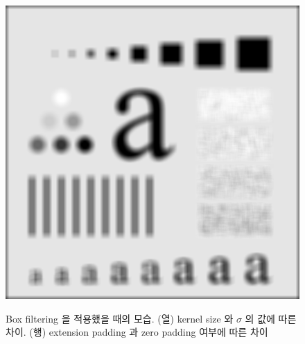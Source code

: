 \documentclass[a4paper, 12p]{paper}
\begin{document}
\begin{figure}[H]
{\includegraphics[scale=0.22]{../data/box2_zeropad.png}
}
\caption{Box filtering 을 적용했을 때의 모습. (열) kernel size 와 $\sigma$ 의 값에 따른 차이. (행) extension padding 과 zero padding 여부에 따른 차이}\label{fig:box_result}
\end{figure}
\end{document}
